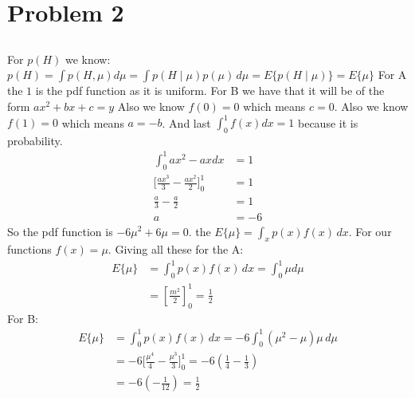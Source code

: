 \section{Problem 2}
\subsection{}
For $p(H)$ we know:
$p(H) = \int p(H,\mu) d\mu = \int p(H\mid\mu)p(\mu)\,d\mu = E\{p(H\mid\mu)\} = E\{\mu\}$
For A the $1$ is the pdf function as it is uniform.
For B we have that it will be of the form $ax^2+bx+c=y$
Also we know $f(0)=0$ which means $c=0$.
Also we know $f(1)=0$ which means $a=-b$.
And last $\int_0^1f(x)dx =1$ because it is probability.
\begin{align*}
\int_0^1ax^2-axdx &= 1 \\
\Big[ \frac{ax^3}{3} - \frac{ax^2}{2}\Big]_0^1 &=1 \\
\frac{a}{3} - \frac{a}{2} &= 1 \\
a &= -6
\end{align*}
So the pdf function is $-6\mu^2+6\mu=0$.
the $E\{\mu\} = \int_xp(x)f(x) \,dx$.
For our functions $f(x) = \mu$.
Giving all these for the A:
\begin{align*}
E\{\mu\} &= \int_{0}^{1} p(x)f(x) \,dx
=\int_{0}^{1}\mu d\mu \\
&=[\frac{m^2}{2}]_0^1
=\frac{1}{2} 
\end{align*}
For B:
\begin{align*}
E\{\mu\} &= \int_{0}^{1}p(x)f(x) \,dx
=-6\int_{0}^{1} (\mu^2-\mu)\mu \,d\mu \\
&=-6\Big[ \frac{\mu^4}{4}-\frac{\mu^3}{3}\Big]_0^1
=-6(\frac{1}{4}-\frac{1}{3}) \\
&=-6(-\frac{1}{12})
=\frac{1}{2}
\end{align*}
